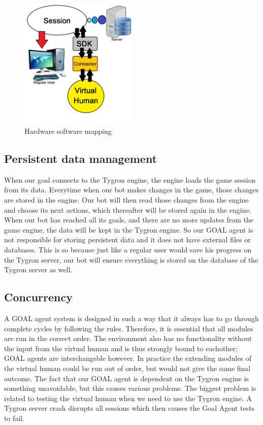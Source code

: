 \begin{figure}[h]
	\centering
	\includegraphics[width=0.5\textwidth]{Hardware_software_mapping}
	\caption{Hardware software mapping}
	\label{fig:Hard_soft_map}
\end{figure}

\subsection{Persistent data management}
When our goal connects to the Tygron engine, the engine loads the game session from its data. Everytime when our bot makes changes in the game, those changes are stored in the engine. Our bot will then read those changes from the engine and choose its next actions, which thereafter will be stored again in the engine. When our bot has reached all its goals, and there are no more updates from the game engine, the data will be kept in the Tygron engine. So our GOAL agent is not responsible for storing persistent data and it does not have external files or databases. This is so because just like a regular user would save his progress on the Tygron server, our bot will ensure everything is stored on the database of the Tygron server as well.

\subsection{Concurrency}
A GOAL agent system is designed in such a way that it always has to go through complete cycles by following the rules. Therefore, it is essential that all modules are run in the correct order. The environment also has no functionality without the input from the virtual human and is thus strongly bound to eachother; GOAL agents are interchangeble however. In practice the extending modules of the virtual human could be run out of order, but would not give the same final outcome. The fact that our GOAL agent is dependent on the Tygron engine is something unavoidable, but this causes various problems. The biggest problem is related to testing the virtual human when we need to use the Tygron engine. A Tygron server crash disrupts all sessions which then causes the Goal Agent tests to fail.

